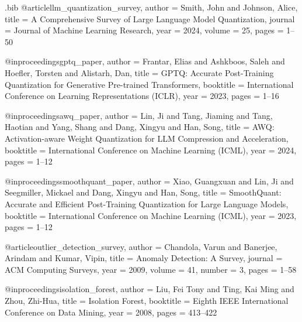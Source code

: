 \usepackage[UTF8]{ctex}

\usepackage{filecontents}

\begin{filecontents}{\jobname.bib}
@article{llm_quantization_survey,
  author =       {Smith, John and Johnson, Alice},
  title =        {A Comprehensive Survey of Large Language Model Quantization},
  journal =      {Journal of Machine Learning Research},
  year =         2024,
  volume =       25,
  pages =        {1--50}
}

@inproceedings{gptq_paper,
  author =       {Frantar, Elias and Ashkboos, Saleh and Hoefler, Torsten and Alistarh, Dan},
  title =        {GPTQ: Accurate Post-Training Quantization for Generative Pre-trained Transformers},
  booktitle =    {International Conference on Learning Representations (ICLR)},
  year =         2023,
  pages =        {1--16}
}

@inproceedings{awq_paper,
  author =       {Lin, Ji and Tang, Jiaming and Tang, Haotian and Yang, Shang and Dang, Xingyu and Han, Song},
  title =        {AWQ: Activation-aware Weight Quantization for LLM Compression and Acceleration},
  booktitle =    {International Conference on Machine Learning (ICML)},
  year =         2024,
  pages =        {1--12}
}

@inproceedings{smoothquant_paper,
  author =       {Xiao, Guangxuan and Lin, Ji and Seegmiller, Mickael and Dang, Xingyu and Han, Song},
  title =        {SmoothQuant: Accurate and Efficient Post-Training Quantization for Large Language Models},
  booktitle =    {International Conference on Machine Learning (ICML)},
  year =         2023,
  pages =        {1--12}
}

@article{outlier_detection_survey,
  author =       {Chandola, Varun and Banerjee, Arindam and Kumar, Vipin},
  title =        {Anomaly Detection: A Survey},
  journal =      {ACM Computing Surveys},
  year =         2009,
  volume =       41,
  number =       3,
  pages =        {1--58}
}

@inproceedings{isolation_forest,
  author =       {Liu, Fei Tony and Ting, Kai Ming and Zhou, Zhi-Hua},
  title =        {Isolation Forest},
  booktitle =    {Eighth IEEE International Conference on Data Mining},
  year =         2008,
  pages =        {413--422}
}


\end{filecontents}
